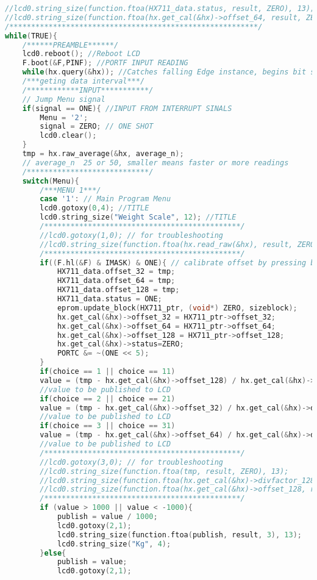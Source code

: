 \begin{lstlisting}[language=C, caption={main.c}, label=main-c, captionpos=b]
//lcd0.string_size(function.ftoa(HX711_data.status, result, ZERO), 13);
//lcd0.string_size(function.ftoa(hx.get_cal(&hx)->offset_64, result, ZERO), 13);
/*********************************************************/
while(TRUE){
	/******PREAMBLE******/
	lcd0.reboot(); //Reboot LCD
	F.boot(&F,PINF); //PORTF INPUT READING
	while(hx.query(&hx)); //Catches falling Edge instance, begins bit shifting.
	/***geting data interval***/
	/************INPUT***********/
	// Jump Menu signal
	if(signal == ONE){ //INPUT FROM INTERRUPT SINALS
		Menu = '2';
		signal = ZERO; // ONE SHOT
		lcd0.clear();
	}
	tmp = hx.raw_average(&hx, average_n);
	// average_n  25 or 50, smaller means faster or more readings
	/****************************/
	switch(Menu){
		/***MENU 1***/
		case '1': // Main Program Menu
		lcd0.gotoxy(0,4); //TITLE
		lcd0.string_size("Weight Scale", 12); //TITLE
		/*********************************************/
		//lcd0.gotoxy(1,0); // for troubleshooting
		//lcd0.string_size(function.ftoa(hx.read_raw(&hx), result, ZERO), 13);
		/*********************************************/
		if((F.hl(&F) & IMASK) & ONE){ // calibrate offset by pressing button 1
			HX711_data.offset_32 = tmp;
			HX711_data.offset_64 = tmp;
			HX711_data.offset_128 = tmp;
			HX711_data.status = ONE;
			eprom.update_block(HX711_ptr, (void*) ZERO, sizeblock);
			hx.get_cal(&hx)->offset_32 = HX711_ptr->offset_32;
			hx.get_cal(&hx)->offset_64 = HX711_ptr->offset_64;
			hx.get_cal(&hx)->offset_128 = HX711_ptr->offset_128;
			hx.get_cal(&hx)->status=ZERO;
			PORTC &= ~(ONE << 5);
		}
		if(choice == 1 || choice == 11)
		value = (tmp - hx.get_cal(&hx)->offset_128) / hx.get_cal(&hx)->divfactor_128;
		//value to be published to LCD
		if(choice == 2 || choice == 21)
		value = (tmp - hx.get_cal(&hx)->offset_32) / hx.get_cal(&hx)->divfactor_32;
		//value to be published to LCD
		if(choice == 3 || choice == 31)
		value = (tmp - hx.get_cal(&hx)->offset_64) / hx.get_cal(&hx)->divfactor_64;
		//value to be published to LCD
		/*********************************************/
		//lcd0.gotoxy(3,0); // for troubleshooting
		//lcd0.string_size(function.ftoa(tmp, result, ZERO), 13);
		//lcd0.string_size(function.ftoa(hx.get_cal(&hx)->divfactor_128, result, ZERO), 13);
		//lcd0.string_size(function.ftoa(hx.get_cal(&hx)->offset_128, result, ZERO), 13);
		/*********************************************/
		if (value > 1000 || value < -1000){
			publish = value / 1000;
			lcd0.gotoxy(2,1);
			lcd0.string_size(function.ftoa(publish, result, 3), 13);
			lcd0.string_size("Kg", 4);
		}else{
			publish = value;
			lcd0.gotoxy(2,1);

\end{lstlisting}

